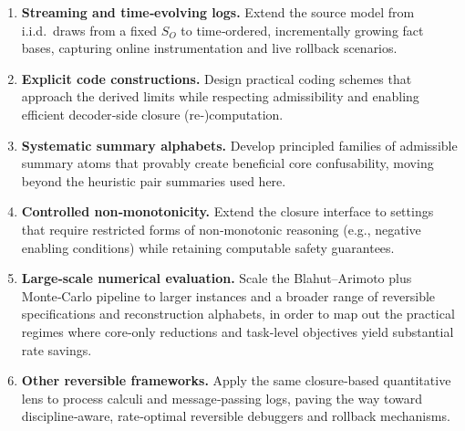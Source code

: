 \documentclass[twoside]{article}
\newcommand{\1}{\mathbf{1}}
\begin{document}
\begin{enumerate}[leftmargin=*, itemsep=1pt]
  \item \textbf{Streaming and time‑evolving logs.}
        Extend the source model from i.i.d.\ draws from a fixed \(S_O\) to
        time‑ordered, incrementally growing fact bases, capturing online
        instrumentation and live rollback scenarios.

  \item \textbf{Explicit code constructions.}
        Design practical coding schemes that approach the derived limits while
        respecting admissibility and enabling efficient decoder‑side closure
        (re‑)computation.

  \item \textbf{Systematic summary alphabets.}
        Develop principled families of admissible summary atoms that provably
        create beneficial core confusability, moving beyond the heuristic
        pair summaries used here.

  \item \textbf{Controlled non‑monotonicity.}
        Extend the closure interface to settings that require restricted forms
        of non‑monotonic reasoning (e.g., negative enabling conditions) while
        retaining computable safety guarantees.

  \item \textbf{Large‑scale numerical evaluation.}
        Scale the Blahut--Arimoto plus Monte‑Carlo pipeline to larger
        instances and a broader range of reversible specifications and
        reconstruction alphabets, in order to map out the practical regimes
        where core‑only reductions and task‑level objectives yield
        substantial rate savings.

  \item \textbf{Other reversible frameworks.}
        Apply the same closure‑based quantitative lens to process calculi and
        message‑passing logs, paving the way toward discipline‑aware,
        rate‑optimal reversible debuggers and rollback mechanisms.
\end{enumerate}



\end{document}
